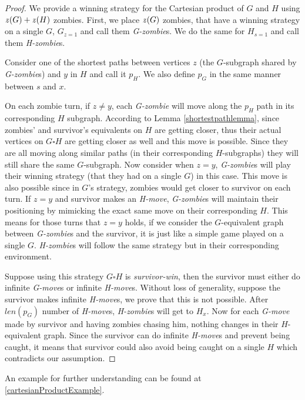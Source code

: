 \documentclass[1p]{elsarticle}
\newcommand{\zn}{\ooalign{$z$\cr\hfil\rule[.5ex]{.2em}{.08ex}\hfil\cr}}
\begin{document}
\begin{proof}
	We provide a winning strategy for the Cartesian product of $G$ and $H$ using $\zn(G)+\zn(H)$ zombies. First, we place
	$\zn(G)$ zombies, that have a winning strategy on a single $G$, $G_{z = 1}$ and call them {\it G-zombie}s. We do the
	same for $H_{s = 1}$ and call them {\it H-zombie}s.


	Consider one of the shortest paths between vertices $z$ (the $G$-subgraph shared by {\it G-zombie}s) and $y$ in $H$
	and call it $p_H$. We also define $p_G$ in the same manner between $s$ and $x$.


	On each zombie turn, if $z \neq y$, each {\it G-zombie} will move along the $p_H$ path in its corresponding $H$
	subgraph. According to Lemma \ref{shortestpathlemma}, since zombies' and survivor's equivalents on $H$ are getting
	closer, thus their actual vertices on $G \square H$ are getting closer as well and this move is possible. Since they
	are all moving along similar paths (in their corresponding $H$-subgraphs) they will still share the same
	$G$-subgraph. Now consider when $z = y$, {\it G-zombie}s will play their winning strategy (that they had on a single
	$G$) in this case. This move is also possible since in $G$'s strategy, zombies would get closer to survivor on each
	turn. If $z = y$ and survivor makes an {\it H-move}, {\it G-zombie}s will maintain their positioning by mimicking
	the exact same move on their corresponding $H$. This means for those turns that $z=y$ holds, if we consider the
	$G$-equivalent graph between {\it G-zombie}s and the survivor, it is just like a simple game played on a single $G$.
	{\it H-zombie}s will follow the same strategy but in their corresponding environment.
	
	
	Suppose using this strategy $G \square H$ is {\it survivor-win}, then the survivor must either do infinite {\it
	G-move}s or infinite {\it H-move}s. Without loss of generality, suppose the survivor makes infinite {\it H-move}s,
	we prove that this is not possible. After $len(p_G)$ number of {\it H-move}s, {\it H-zombie}s will get to $H_x$. Now for
	each {\it G-move} made by survivor and having zombies chasing him, nothing changes in their $H$-equivalent graph.
	Since the survivor can do infinite {\it H-move}s and prevent being caught, it means that survivor could also avoid
	being caught on a single $H$ which contradicts our assumption.
	
\end{proof}
An example for further understanding can be found at \ref{cartesianProductExample}.
\end{document}
